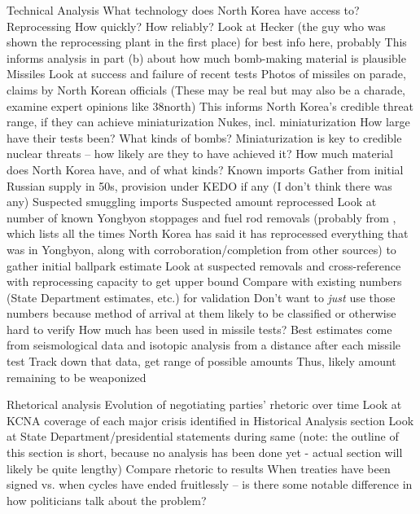 \documentclass{article}
\begin{document}
\begin{outline}[enumerate]
\1 Technical Analysis
    \2 What technology does North Korea have access to?
        \3 Reprocessing
            \4 How quickly? How reliably?
            \4 Look at Hecker (the guy who was shown the reprocessing plant in the first place) for best info here, probably
            \4 This informs analysis in part (b) about how much bomb-making material is plausible
        \3 Missiles
            \4 Look at success and failure of recent tests
            \4 Photos of missiles on parade, claims by North Korean officials (These may be real but may also be a charade, examine expert opinions like 38north)
            \4 This informs North Korea’s credible threat range, if they can achieve miniaturization
        \3 Nukes, incl. miniaturization
            \4 How large have their tests been? What kinds of bombs?
            \4 Miniaturization is key to credible nuclear threats – how likely are they to have achieved it?
    \2 How much material does North Korea have, and of what kinds?
        \3 Known imports
            \4 Gather from initial Russian supply in 50s, provision under KEDO if any (I don’t think there was any)
        \3 Suspected smuggling imports
        \3 Suspected amount reprocessed
            \4 Look at number of known Yongbyon stoppages and fuel rod removals (probably from \cite{davenport}, which lists all the times North Korea has said it has reprocessed everything that was in Yongbyon, along with corroboration/completion from other sources) to gather initial ballpark estimate
            \4 Look at suspected removals and cross-reference with reprocessing capacity to get upper bound
            \4 Compare with existing numbers (State Department estimates, etc.) for validation
            \4 Don’t want to \emph{just} use those numbers because method of arrival at them likely to be classified or otherwise hard to verify
    \2 How much has been used in missile tests?
        \3 Best estimates come from seismological data and isotopic analysis from a distance after each missile test
        \3 Track down that data, get range of possible amounts
    \2 Thus, likely amount remaining to be weaponized

\1 Rhetorical analysis
    \2 Evolution of negotiating parties’ rhetoric over time
        \3 Look at KCNA coverage of each major crisis identified in Historical Analysis section
        \3 Look at State Department/presidential statements during same
        \3 (note: the outline of this section is short, because no analysis has been done yet - actual section will likely be quite lengthy)
    \2 Compare rhetoric to results
        \3 When treaties have been signed vs. when cycles have ended fruitlessly – is there some notable difference in how politicians talk about the problem?


\end{outline}
\end{document}
